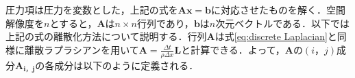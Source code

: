 \documentclass[a4j,12pt]{jreport}
\begin{document}



圧力項は圧力を変数とした，上記の式を$\bm{Ax=b}$に対応させたものを解く．空間解像度を$n$とすると，$\bm{A}$は$n \times n$行列であり，$\bm{b}$は$n$次元ベクトルである．以下では上記の式の離散化方法について説明する．行列$\bm{A}$は式\ref{eq:discrete Laplacian}と同様に離散ラプラシアンを用いて$\bm{A} = \frac{\varDelta t}{\rho \varDelta x}\bm{L}$と計算できる．よって，$\bm{A}$の$(i，j)$成分$\bm{A_{i，j}}$の各成分は以下のように定義される．
\end{document}
